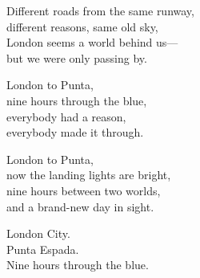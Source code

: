 \begin{lyrics}
Different roads from the same runway,\\
different reasons, same old sky,\\
London seems a world behind us—\\
but we were only passing by.


London to Punta,\\
nine hours through the blue,\\
everybody had a reason,\\
everybody made it through.

London to Punta,\\
now the landing lights are bright,\\
nine hours between two worlds,\\
and a brand-new day in sight.


London City.\\
Punta Espada.\\
Nine hours through the blue.
\end{lyrics}

